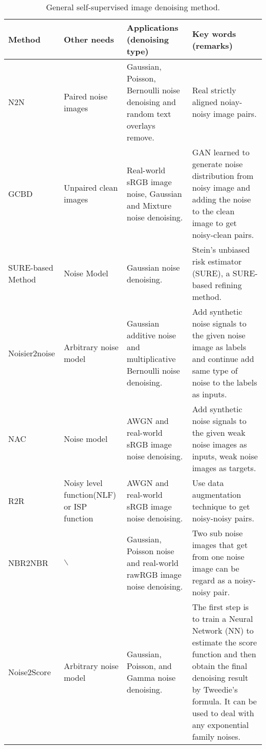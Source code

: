 \documentclass[conference]{IEEEtran}
\begin{document}
\begin{table*}[t]
	\setlength{\abovecaptionskip}{0cm}
	\setlength{\belowcaptionskip}{0cm}
	\caption{General self-supervised image denoising method.}
	\centering
	\begin{tabular}{|m{2.2cm}<{\raggedright}|m{2cm}<{\raggedright}|m{4cm}<{\raggedright}|m{7.5cm}<{\raggedright}|}%
		\hline
		Method&	Other needs	&Applications (denoising type)	&Key words (remarks)\\
		\hline
		N2N\cite{lehtinen2018noise2noise}&	Paired noise images&	Gaussian, Poisson, Bernoulli noise denoising and random text overlays remove.&	Real strictly aligned noiay-noisy image pairs.\\
		\hline
		GCBD \cite{chen2018image}&	Unpaired clean images&	Real-world sRGB image noise, Gaussian and Mixture noise denoising.&	GAN learned to generate noise distribution from noisy image and adding the noise to the clean image to get noisy-clean pairs.\\
		\hline
		SURE-based Method\cite{soltanayev2018training}&	Noise Model&	Gaussian noise denoising.&	Stein’s unbiased risk estimator (SURE), a SURE-based refining method.\\
		\hline
		Noisier2noise \cite{moran2020noisier2noise}&	Arbitrary noise model&	Gaussian additive noise and multiplicative Bernoulli noise denoising.&	Add synthetic noise signals to the given noise image as labels and continue add same type of noise to the labels as inputs. \\
		\hline
		NAC \cite{xu2020noisy}	&Noise model & AWGN and real-world sRGB image noise denoising.&	Add synthetic noise signals to the given weak noise images as inputs, weak noise images as targets.\\
		\hline
		R2R \cite{pang2021recorrupted}&	Noisy level function(NLF) or ISP function&	AWGN and real-world sRGB image noise denoising.&	Use data augmentation technique to get noisy-noisy pairs.\\
		\hline
		NBR2NBR \cite{huang2021neighbor2neighbor}&	$\backslash$	&Gaussian, Poisson  noise and real-world rawRGB image noise denoising.&	Two sub noise images that get from one noise image can be regard as a noisy-noisy pair.\\
		\hline
		Noise2Score \cite{kim2021noise2score}&	Arbitrary noise model&	Gaussian, Poisson, and Gamma noise denoising.&	The first step is to train a Neural Network (NN) to estimate the score function and then obtain the final denoising result by Tweedie’s formula. It can be used to deal with any exponential family noises.\\

\end{tabular}
\end{table*}
\end{document}
